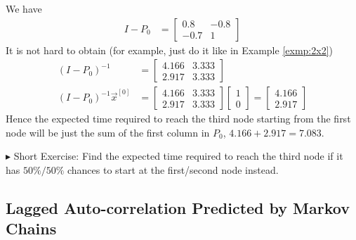\begin{solution}
We have
\begin{align*}
I - P_0 &= 
\begin{bmatrix}
0.8 & -0.8\\
-0.7 & 1 
\end{bmatrix} 
\end{align*}
It is not hard to obtain (for example, just do it like in Example \ref{exmp:2x2})
\begin{align*}
(I - P_0)^{-1} &= 
\begin{bmatrix}
4.166 & 3.333 \\
2.917 & 3.333
\end{bmatrix} \\
(I - P_0)^{-1}\vec{x}^{[0]} &= 
\begin{bmatrix}
4.166 & 3.333 \\
2.917 & 3.333
\end{bmatrix}
\begin{bmatrix}
1 \\
0
\end{bmatrix} 
=
\begin{bmatrix}
4.166 \\
2.917
\end{bmatrix}
\end{align*}
Hence the expected time required to reach the third node starting from the first node will be just the sum of the first column in $P_0$, $4.166 + 2.917 = 7.083$.
\end{solution}
$\blacktriangleright$ Short Exercise: Find the expected time required to reach the third node if it has $50\%/50\%$ chances to start at the first/second node instead.\footnotemark

\subsection{Lagged Auto-correlation Predicted by Markov Chains}

